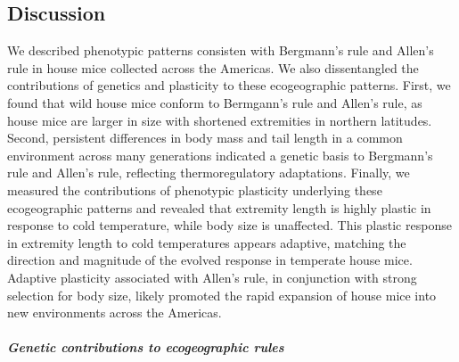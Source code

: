 \documentclass[]{article}
\let\oldsubparagraph\subparagraph
\renewcommand{\subparagraph}[1]{\oldsubparagraph{#1}\mbox{}}
\begin{document}
\vspace{5mm}

\hypertarget{discussion}{%
\subsection{Discussion}\label{discussion}}

We described phenotypic patterns consisten with Bergmann's rule and
Allen's rule in house mice collected across the Americas. We also
dissentangled the contributions of genetics and plasticity to these
ecogeographic patterns. First, we found that wild house mice conform to
Bermgann's rule and Allen's rule, as house mice are larger in size with
shortened extremities in northern latitudes. Second, persistent
differences in body mass and tail length in a common environment across
many generations indicated a genetic basis to Bergmann's rule and
Allen's rule, reflecting thermoregulatory adaptations. Finally, we
measured the contributions of phenotypic plasticity underlying these
ecogeographic patterns and revealed that extremity length is highly
plastic in response to cold temperature, while body size is unaffected.
This plastic response in extremity length to cold temperatures appears
adaptive, matching the direction and magnitude of the evolved response
in temperate house mice. Adaptive plasticity associated with Allen's
rule, in conjunction with strong selection for body size, likely
promoted the rapid expansion of house mice into new environments across
the Americas.

\vspace{2.5mm}

\hypertarget{genetic-contributions-to-ecogeographic-rules}{%
\subparagraph{\texorpdfstring{\emph{Genetic contributions to
ecogeographic
rules}}{Genetic contributions to ecogeographic rules}}\label{genetic-contributions-to-ecogeographic-rules}}
\end{document}

